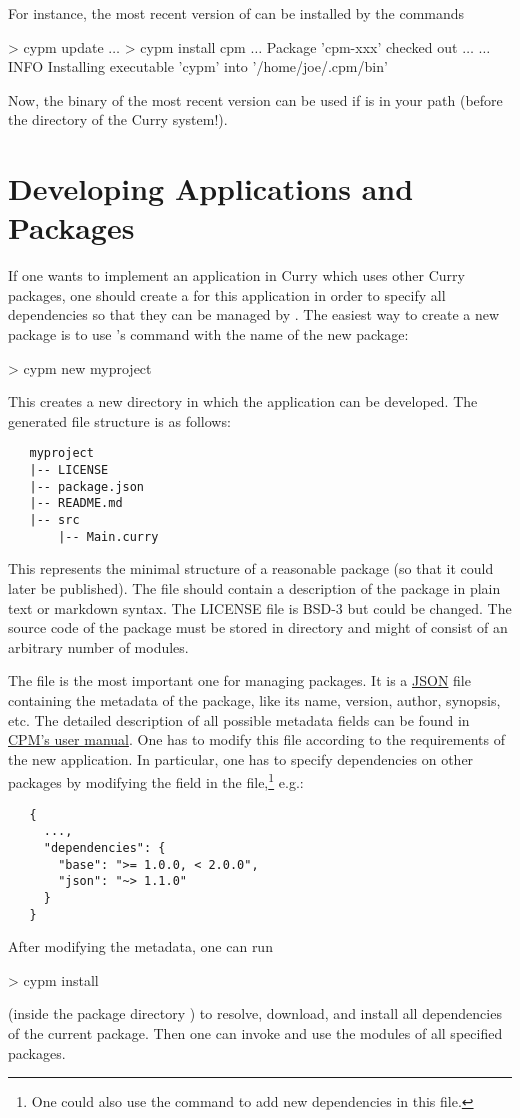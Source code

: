 For instance, the most recent version of \cpm
can be installed by the commands
%
\begin{prog}
> cypm update
$\ldots$
> cypm install cpm
$\ldots$ Package 'cpm-xxx' checked out $\ldots$
$\ldots$
INFO  Installing executable 'cypm' into '/home/joe/.cpm/bin'
\end{prog}
%
Now, the binary  of the most recent \cpm version can be used
if  is in your path
(before the  directory of the Curry system!).


\section{Developing Applications and Packages}
\label{sec:writing-packages}

If one wants to implement an application in Curry which uses
other Curry packages, one should create a  for
this application in order to specify all dependencies
so that they can be managed by \cpm.
The easiest way to create a new package is to use
\cpm's  command with the name of the new package:
%
\begin{prog}
> cypm new myproject
\end{prog}
%
This creates a new directory  in which
the application can be developed.
The generated file structure is as follows:
%
\begin{verbatim}
   myproject
   |-- LICENSE
   |-- package.json
   |-- README.md
   |-- src
       |-- Main.curry
\end{verbatim}
%
This represents the minimal structure of a reasonable package
(so that it could later be published).
The file  should contain a description
of the package in plain text or markdown syntax.
The LICENSE file is BSD-3 but could be changed.
The source code of the package must be stored
in directory  and might of consist of an arbitrary
number of modules.

The file  is the most important one
for managing packages. It is a \href{http://json.org}{JSON} file
containing the metadata of the package,
like its name, version, author, synopsis, etc.
The detailed description of all possible metadata fields
can be found in
\href{http://curry-language.org/tools/cpm}{CPM's user manual}.
One has to modify this file according to the requirements
of the new application.
In particular, one has to specify dependencies on other packages
by modifying the field  in the
 file,\footnote{One could also use the command
 to add new dependencies in this file.}
e.g.:
%
\begin{verbatim}
   {
     ...,
     "dependencies": {
       "base": ">= 1.0.0, < 2.0.0",
       "json": "~> 1.1.0"
     }
   }
\end{verbatim}
%
After modifying the metadata, one can run
%
\begin{prog}
> cypm install
\end{prog}
%
(inside the package directory )
to resolve, download, and install all dependencies of the current package.
Then one can invoke \pakcs and use the modules of all specified
packages.

